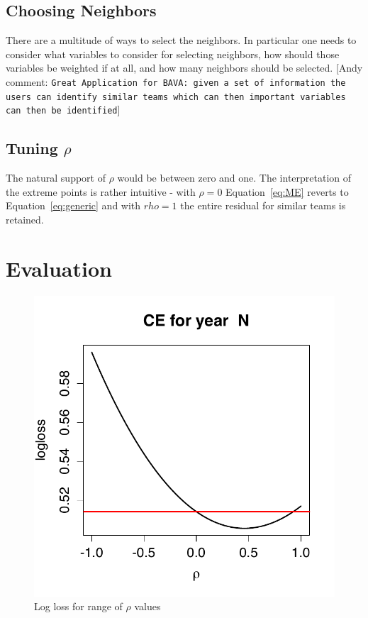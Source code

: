 \documentclass[11pt]{article} %
\newcommand{\andyc}[1]{[{\color{red}\sc Andy comment: {\tt #1}}]}
\begin{document}
\subsection{Choosing Neighbors}
There are a multitude of ways to select the neighbors.  In particular one needs to consider what variables to consider for selecting neighbors, how should those variables be weighted if at all, and how many neighbors should be selected. \andyc{Great Application for BAVA: given a set of information the users can identify similar teams which can then important variables can then be identified}  
\subsection{Tuning $\rho$}
The natural support of $\rho$ would be between zero and one.  The interpretation of the extreme points is rather intuitive - with $\rho = 0$ Equation~\ref{eq:ME} reverts to Equation~\ref{eq:generic} and with $rho = 1$ the entire residual for similar teams is retained.

\section{Evaluation}
\begin{figure}[h]
\includegraphics[width=1\textwidth]{Sample_ME.pdf}
\caption{Log loss for range of $\rho$ values}
\end{figure}
\end{document}
